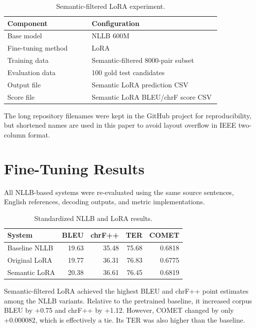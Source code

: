 \documentclass[conference]{IEEEtran}
\begin{document}
\begin{table}[H]
\centering
\caption{Semantic-filtered LoRA experiment.}
\footnotesize
\begin{tabular}{p{0.34\linewidth}p{0.52\linewidth}}
\toprule
\textbf{Component} & \textbf{Configuration} \\
\midrule
Base model & NLLB 600M \\
Fine-tuning method & LoRA \\
Training data & Semantic-filtered 8000-pair subset \\
Evaluation data & 100 gold test candidates \\
Output file & Semantic LoRA prediction CSV \\
Score file & Semantic LoRA BLEU/chrF score CSV \\
\bottomrule
\end{tabular}
\end{table}

The long repository filenames were kept in the GitHub project for reproducibility, but shortened names are used in this paper to avoid layout overflow in IEEE two-column format.

\section{Fine-Tuning Results}

All NLLB-based systems were re-evaluated using the same
source sentences, English references, decoding outputs, and
metric implementations.

\begin{table}[H]
\centering
\caption{Standardized NLLB and LoRA results.}
\label{tab:nllb-lora-results}
\small
\begin{tabular}{lrrrr}
\toprule
\textbf{System} &
\textbf{BLEU} &
\textbf{chrF++} &
\textbf{TER} &
\textbf{COMET} \\
\midrule
Baseline NLLB &
19.63 &
35.48 &
75.68 &
0.6818 \\
Original LoRA &
19.77 &
36.31 &
76.83 &
0.6775 \\
Semantic LoRA &
20.38 &
36.61 &
76.45 &
0.6819 \\
\bottomrule
\end{tabular}
\end{table}

Semantic-filtered LoRA achieved the highest BLEU and
chrF++ point estimates among the NLLB variants. Relative
to the pretrained baseline, it increased corpus BLEU by
+0.75 and chrF++
by +1.12.
However, COMET changed by only
+0.000082, which is
effectively a tie. Its TER was also higher than the baseline.
\end{document}
